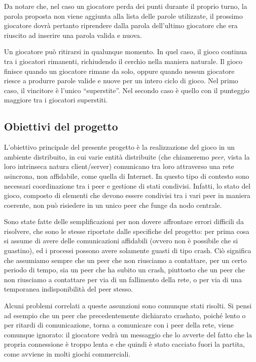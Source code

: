 \documentclass[10.5pt]{article}
\begin{document}
Da notare che, nel caso un giocatore perda dei punti durante il proprio turno, la parola proposta non viene aggiunta alla lista delle parole utilizzate, il prossimo giocatore dovrà pertanto riprendere dalla parola dell'ultimo giocatore che era riuscito ad inserire una parola valida e nuova.

Un giocatore può ritirarsi in qualunque momento. In quel caso, il gioco continua tra i giocatori rimanenti, richiudendo il cerchio nella maniera naturale. Il gioco finisce quando un giocatore rimane da solo, oppure quando nessun giocatore riesce a produrre parole valide e nuove per un intero ciclo di gioco. Nel primo caso, il vincitore è l'unico ``superstite''. Nel secondo caso è quello con il punteggio maggiore tra i giocatori superstiti.

\subsection{Obiettivi del progetto}

L'obiettivo principale del presente progetto è la realizzazione del gioco in un ambiente distribuito, in cui varie entità distribuite (che chiameremo \emph{peer}, vista la loro intrinseca natura client/server) comunicano tra loro attraverso una rete asincrona, non affidabile, come quella di Internet. In questo tipo di contesto sono necessari coordinazione tra i peer e gestione di stati condivisi. Infatti, lo stato del gioco, composto di elementi che devono essere condivisi tra i vari peer in maniera coerente, non può risiedere in un unico peer che funge da nodo centrale.

Sono state fatte delle semplificazioni per non dovere affrontare errori difficili da risolvere, che sono le stesse riportate dalle specifiche del progetto: per prima cosa si assume di avere delle comunicazioni affidabili (ovvero non è possibile che si guastino), ed i processi possono avere solamente guasti di tipo crash. Ciò significa che assumiamo sempre che un peer che non riusciamo a contattare, per un certo periodo di tempo, sia un peer che ha subito un crash, piuttosto che un peer che non riusciamo a contattare per via di un fallimento della rete, o per via di una temporanea indisponibilità del peer stesso. 

Alcuni problemi correlati a queste assunzioni sono comunque stati risolti. Si pensi ad esempio che un peer che precedentemente dichiarato crashato, poiché lento o per ritardi di comunicazione, torna a comunicare con i peer della rete, viene comunque ignorato: il giocatore vedrà un messaggio che lo avverte del fatto che la propria connessione è troppo lenta e che quindi è stato cacciato fuori la partita, come avviene in molti giochi commerciali.
\end{document}
